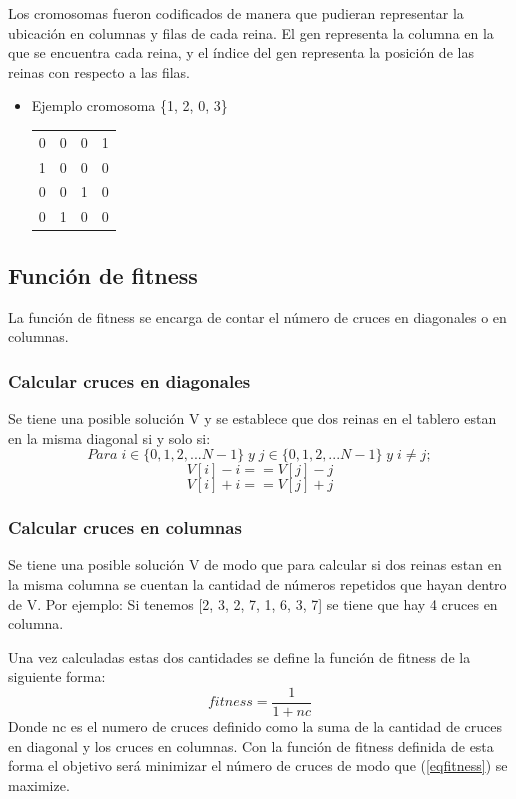 \documentclass[11pt]{article}
\begin{document}
Los cromosomas fueron codificados de manera que pudieran representar la ubicaci\'on en columnas y filas de cada reina. El gen representa la columna en la que se encuentra cada reina, y el \'indice del gen representa la posici\'on de las reinas con respecto a las filas.
\begin{itemize}
\item Ejemplo cromosoma \{1, 2, 0, 3\}
\begin{center}
\begin{tabular}{ c c c c }
	0 & 0 & 0 & 1\\
	1 & 0 & 0 & 0\\
	0 & 0 & 1 & 0\\
	0 & 1 & 0 & 0
\end{tabular}
\end{center}
\end{itemize}
\subsection{Funci\'on de fitness}
La funci\'on de fitness se encarga de contar el n\'umero de
cruces en diagonales o en columnas.
\subsubsection{Calcular cruces en diagonales}
Se tiene una posible soluci\'on V y se establece que dos reinas en el tablero estan en la misma diagonal si y solo si:
\[Para\;i \in \{0, 1, 2, ... N-1\}\;y\;j \in \{0, 1, 2, ... N-1\}\;y\;i \neq j;\]
\[V[i] - i == V[j] - j\]
\[V[i] + i == V[j] + j\]
\subsubsection{Calcular cruces en columnas}
Se tiene una posible soluci\'on V de modo que para calcular si dos reinas estan en la
misma columna se cuentan la cantidad de n\'umeros repetidos que hayan dentro de V.
Por ejemplo: Si tenemos [2, 3, 2, 7, 1, 6, 3, 7] se tiene que hay 4 cruces en columna.

Una vez calculadas estas dos cantidades se define la funci\'on de fitness de la siguiente
forma:
\begin{equation}\label{eqfitness}
    fitness = \frac{1}{1+nc}
\end{equation}
Donde nc es el numero de cruces definido como la suma de la cantidad de cruces en diagonal
y los cruces en columnas.
Con la funci\'on de fitness definida de esta forma el objetivo ser\'a
minimizar el n\'umero de cruces de modo que (\ref{eqfitness}) se maximize.
\end{document}
